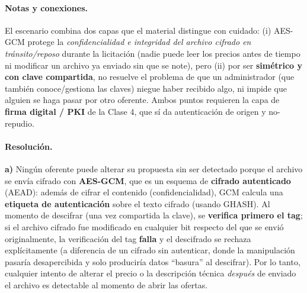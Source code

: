 \paragraph{Notas y conexiones.}
El escenario combina dos capas que el material distingue con cuidado: (i) AES-GCM protege
la \emph{confidencialidad e integridad del archivo cifrado en tránsito/reposo} durante la
licitación (nadie puede leer los precios antes de tiempo ni modificar un archivo ya
enviado sin que se note), pero (ii) por ser \textbf{simétrico y con clave compartida}, no
resuelve el problema de que un administrador (que también conoce/gestiona las claves)
niegue haber recibido algo, ni impide que alguien se haga pasar por otro oferente. Ambos
puntos requieren la capa de \textbf{firma digital / PKI} de la Clase 4, que sí da
autenticación de origen y no-repudio.

\paragraph{Resolución.}

\textbf{a)} Ningún oferente puede alterar su propuesta sin ser detectado porque el archivo
se envía cifrado con \textbf{AES-GCM}, que es un esquema de \textbf{cifrado autenticado}
(AEAD): además de cifrar el contenido (confidencialidad), GCM calcula una \textbf{etiqueta
de autenticación} sobre el texto cifrado (usando GHASH). Al momento de descifrar (una vez
compartida la clave), se \textbf{verifica primero el tag}; si el archivo cifrado fue
modificado en cualquier bit respecto del que se envió originalmente, la verificación del
tag \textbf{falla} y el descifrado se rechaza explícitamente (a diferencia de un cifrado
sin autenticar, donde la manipulación pasaría desapercibida y solo produciría datos
``basura'' al descifrar). Por lo tanto, cualquier intento de alterar el precio o la
descripción técnica \emph{después} de enviado el archivo es detectable al momento de
abrir las ofertas.

